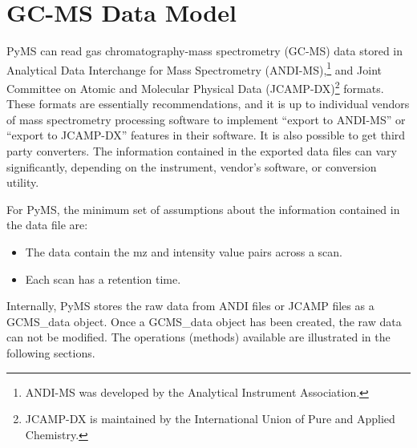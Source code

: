 

\chapter{GC-MS Data Model}

PyMS can read gas chromatography-mass spectrometry (GC-MS) data stored in
Analytical Data Interchange for Mass Spectrometry (ANDI-MS),\footnote{ANDI-MS
was developed by the Analytical Instrument Association.} and Joint Committee on
Atomic and Molecular Physical Data (JCAMP-DX)\footnote{JCAMP-DX is maintained by
the International Union of Pure and Applied Chemistry.} formats. These formats
are essentially recommendations, and it is up to individual vendors of mass
spectrometry processing software to implement ``export to ANDI-MS'' or ``export
to JCAMP-DX'' features in their software. It is also possible to get third party
converters. The information contained in the exported data files
can vary significantly, depending on the instrument, vendor's software, or
conversion utility.

For PyMS, the minimum set of assumptions about the information contained in the
data file are:
\begin{itemize}
    \item The data contain the mz and intensity value pairs across a scan.
    \item Each scan has a retention time.
\end{itemize}

Internally, PyMS stores the raw data from ANDI files or JCAMP files as a
GCMS\_data object. Once a GCMS\_data object has been created, the raw data can
not be modified. The operations (methods) available are illustrated in the
following sections.

